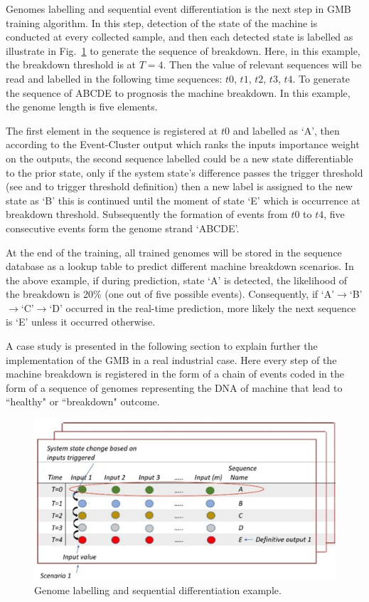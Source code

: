 \documentclass[conference]{IEEEtran}
\begin{document}
Genomes labelling and sequential event differentiation is  the next step in GMB training algorithm. In this step, detection of the state of the machine is conducted at every collected sample, and then each detected state is labelled as illustrate in Fig.~\ref{fig:Genome_labelling} to generate the sequence of breakdown. Here, in this example, the breakdown threshold is at $T=4$. Then the value of relevant sequences will be read and labelled in the following time sequences:  $t0$, $t1$, $t2$, $t3$, $t4$. To generate the sequence of ABCDE to prognosis the machine breakdown. In this example, the genome length is five elements.

The first element in the sequence is registered at $t0$ and labelled as `A', then according to the Event-Cluster output \cite{Kumar2019} which ranks the inputs importance weight on the outputs, the second sequence labelled could be a new state differentiable to the prior state, only if the system state's difference passes the trigger threshold (see \cite{Danishvar2018} and \cite{Tavakoli2013} to trigger threshold definition) then a new label is assigned to the new state as `B' this is continued until the moment of state `E' which is occurrence at breakdown threshold. Subsequently the formation of events from $t0$ to $t4$, five consecutive events form the genome strand `ABCDE'.

At the end of the training, all trained genomes will be stored in the sequence database as a lookup table to predict different machine breakdown scenarios. In the above example, if during prediction, state `A' is detected, the likelihood of the breakdown is 20\% (one out of five possible events). Consequently, if `A'$\to$`B'$\to$`C'$\to$`D' occurred in the real-time prediction, more likely the next sequence is `E' unless it occurred otherwise. 

A case study is presented in the following section to explain further the implementation of the GMB in a real industrial case. Here every step of the machine breakdown is registered in the form of a chain of events coded in the form of a sequence of genomes representing the DNA of machine that lead to ``healthy" or ``breakdown" outcome.
\begin{figure}[tbp]
\centerline{\includegraphics[width=\linewidth]{Genome_Labelling.png}}
\caption{Genome labelling and sequential differentiation example.}
\label{fig:Genome_labelling}
\end{figure}
\end{document}
